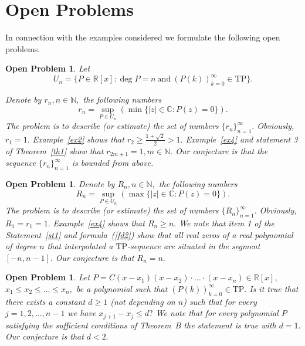 \documentclass[12pt]{amsart}
\newcounter{count}
\numberwithin{count}{section}
\newtheorem{Problem}[count]{Open Problem}
\begin{document}
\section{Open Problems}

In connection with the examples considered we formulate the following open problems.

\begin{Problem}
\label{pr4}
Let
\begin{equation}
\label{f13}
U_n = \{P\in \mathbb{R}[x]  :  \deg P =n\  \mbox{and} \   
(P(k))_{k=0}^\infty \in \mathrm{TP}  \}. 
\end{equation}

Denote by $r_n, n\in \mathbb{N},$ the following numbers
\begin{equation}
\label{f13}
r_n = \sup_{P\in U_n} (\min\{|z| \in \mathbb{C} : P(z)=0 \}).
\end{equation}
The problem is to describe (or estimate) the set of numbers 
$\{r_n\}_{n=1}^\infty.$ Obviously, $r_1=1.$ Example~\ref{ex2} 
shows that $r_2 \geq \frac{1+ \sqrt{2}}{2}>1.$ Example~\ref{ex4} and 
statement 3 of Theorem~\ref{th1} show that $r_{2m+1}=1, m \in \mathbb{N}.$ 
Our conjecture is that the sequence $\{r_n\}_{n=1}^\infty$ is bounded from above.
\end{Problem}



\begin{Problem}
\label{pr5}
Denote by $R_n, n\in \mathbb{N},$ the following numbers
\begin{equation}
\label{f13}
R_n = \sup_{P\in U_n} (\max\{|z| \in \mathbb{C} : P(z)=0 \}).
\end{equation}
The problem is to describe (or estimate) the set of numbers 
$\{R_n\}_{n=1}^\infty.$ Obviously, $R_1=r_1=1.$ Example~\ref{ex4} 
shows that $R_n \geq n.$ We note that item 1 of the Statement~\ref{st1} and 
formula~(\ref{fd2}) show that all real zeros of a real polynomial of degree 
$n$ that interpolated a $\mathrm{TP}$-sequence are situated in the segment $[-n, n-1].$   
Our conjecture is that $R_n = n.$ 
\end{Problem}

\begin{Problem}
\label{pr6}
Let $P = C(x-x_1)(x-x_2) \cdot \ldots \cdot (x-x_n)\in \mathbb{R}[x],$  
$x_1 \leq x_2 \leq \ldots \leq x_n,$  be a polynomial such that  $(P(k))_{k=0}^\infty \in \mathrm{TP}.$
Is it true that there exists a constant $d\geq 1$ (not depending on $n$) such that for every 
$j=1, 2, \ldots, n-1$ we have $x_{j+1} - x_j \leq d?$   
We note that for every polynomial $P$ satisfying the sufficient conditions of 
Theorem~B the statement is true with $d=1.$ Our conjecture is that $d<2.$
\end{Problem}
\end{document}

